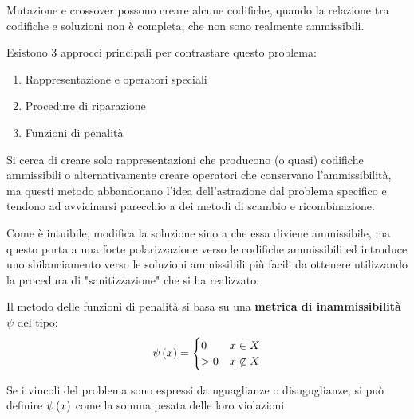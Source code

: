 \documentclass[\main/main.tex]{subfiles}
\begin{document}
\begin{multicols}{2}
\begin{definition}[Mutazione]
\end{definition}
\begin{observation}
    Mutazione e crossover possono creare alcune codifiche, quando la relazione tra codifiche e soluzioni non è completa, che non sono realmente ammissibili.
\end{observation}
\begin{observation}
    Esistono 3 approcci principali per contrastare questo problema:
    \begin{enumerate}
        \item Rappresentazione e operatori speciali
        \item Procedure di riparazione
        \item Funzioni di penalità
    \end{enumerate}
\end{observation}
\begin{definition}
    Si cerca di creare solo rappresentazioni che producono (o quasi) codifiche ammissibili o alternativamente creare operatori che conservano l'ammissibilità, ma questi metodo abbandonano l'idea dell'astrazione dal problema specifico e tendono ad avvicinarsi parecchio a dei metodi di scambio e ricombinazione.
\end{definition}
\begin{definition}
    Come è intuibile, modifica la soluzione sino a che essa diviene ammissibile, ma questo porta a una forte polarizzazione verso le codifiche ammissibili ed introduce uno sbilanciamento verso le soluzioni ammissibili più facili da ottenere utilizzando la procedura di "sanitizzazione" che si ha realizzato.
\end{definition}
\begin{definition}
    Il metodo delle funzioni di penalità si basa su una \textbf{metrica di inammissibilità} \(\psi\) del tipo:
    \[
    \psi\left(x\right) = \begin{cases}
        0 & x \in X\\
        > 0 & x \not\in X
    \end{cases}
    \]
    
    Se i vincoli del problema sono espressi da uguaglianze o disuguglianze, si può definire \(\psi\left(x\right)\) come la somma pesata delle loro violazioni.
    

\end{definition}
\end{multicols}
\end{document}
